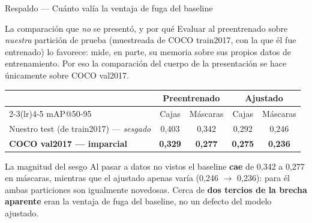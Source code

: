 \documentclass[aspectratio=169,11pt]{beamer}
\begin{document}
\begin{frame}{Respaldo --- Cuánto valía la ventaja de fuga del baseline}
  \begin{alertblock}{La comparación que \emph{no} se presentó, y por qué}
    \footnotesize
    Evaluar al preentrenado sobre \emph{nuestra} partición de prueba (muestreada de COCO
    train2017, con la que él fue entrenado) lo favorece: mide, en parte, su memoria sobre
    sus propios datos de entrenamiento. Por eso la comparación del cuerpo de la
    presentación se hace únicamente sobre COCO val2017.
  \end{alertblock}

  \vspace{0.4em}
  \centering
  \small
  \begin{tabular}{@{}lcccc@{}}
    \toprule
    & \multicolumn{2}{c}{\textbf{Preentrenado}} & \multicolumn{2}{c}{\textbf{Ajustado}} \\
    \cmidrule(lr){2-3}\cmidrule(lr){4-5}
    mAP@50-95 & Cajas & Máscaras & Cajas & Máscaras \\
    \midrule
    Nuestro test (de train2017) --- \emph{sesgado} & 0,403 & 0,342 & 0,292 & 0,246 \\
    \textbf{COCO val2017 --- imparcial} & \textbf{0,329} & \textbf{0,277} & \textbf{0,275} & \textbf{0,236} \\
    \bottomrule
  \end{tabular}

  \vspace{0.6em}
  \begin{exampleblock}{La magnitud del sesgo}
    \footnotesize
    Al pasar a datos no vistos el baseline \textbf{cae} de 0,342 a 0,277 en máscaras,
    mientras que el ajustado apenas varía (0,246 $\to$ 0,236): para él ambas particiones son
    igualmente novedosas. Cerca de \textbf{dos tercios de la brecha aparente} eran la
    ventaja de fuga del baseline, no un defecto del modelo ajustado.
  \end{exampleblock}
\end{frame}
\end{document}
